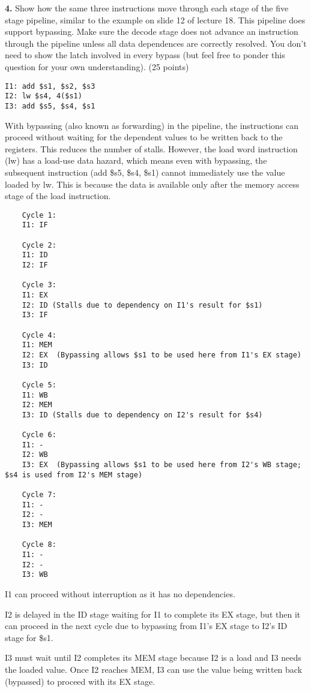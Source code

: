 \documentclass{article}
\begin{document}
\newpage

\textbf{4.} Show how the same three instructions move through each stage of the five
stage pipeline, similar to the example on slide 12 of lecture 18. This pipeline does
support bypassing. Make sure the decode stage does not advance an instruction through
the pipeline unless all data dependences are correctly resolved. You don't need to
show the latch involved in every bypass (but feel free to ponder this question for
your own understanding). (25 points)

\begin{verbatim}
I1: add $s1, $s2, $s3
I2: lw $s4, 4($s1)
I3: add $s5, $s4, $s1
\end{verbatim}

With bypassing (also known as forwarding) in the pipeline, the instructions can
proceed without waiting for the dependent values to be written back to the registers.
This reduces the number of stalls. However, the load word instruction (lw) has a
load-use data hazard, which means even with bypassing, the subsequent instruction
(add \$s5, \$s4, \$s1) cannot immediately use the value loaded by lw. This is
because the data is available only after the memory access stage of the
load instruction.

\begin{verbatim}
    Cycle 1:
    I1: IF

    Cycle 2:
    I1: ID
    I2: IF

    Cycle 3:
    I1: EX
    I2: ID (Stalls due to dependency on I1's result for $s1)
    I3: IF

    Cycle 4:
    I1: MEM
    I2: EX  (Bypassing allows $s1 to be used here from I1's EX stage)
    I3: ID

    Cycle 5:
    I1: WB
    I2: MEM
    I3: ID (Stalls due to dependency on I2's result for $s4)

    Cycle 6:
    I1: -
    I2: WB
    I3: EX  (Bypassing allows $s1 to be used here from I2's WB stage; $s4 is used from I2's MEM stage)

    Cycle 7:
    I1: -
    I2: -
    I3: MEM

    Cycle 8:
    I1: -
    I2: -
    I3: WB
\end{verbatim}

I1 can proceed without interruption as it has no dependencies.

I2 is delayed in the ID stage waiting for I1 to complete its EX stage,
but then it can proceed in the next cycle due to bypassing from I1's
EX stage to I2's ID stage for \$s1.

I3 must wait until I2 completes its MEM stage because I2 is a load
and I3 needs the loaded value. Once I2 reaches MEM, I3 can use the
value being written back (bypassed) to proceed with its EX stage.
\end{document}
